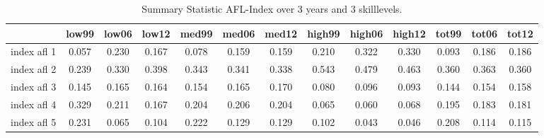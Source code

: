 \begin{table}[htbp]
\caption{\label{Tab:afldesc} Summary Statistic AFL-Index over 3 years and 3 skilllevels.}\centering\medskip
\begin{tabular}{lcccccccccccc} \hline \hline
 & low99  & low06  & low12  & med99  & med06  & med12  & high99  & high06  & high12  & tot99  & tot06  & tot12  \\  \hline 
index afl 1 &   0.057 &   0.230 &   0.167 &   0.078 &   0.159 &   0.159 &   0.210 &   0.322 &   0.330 &   0.093 &   0.186 &   0.186 \\  
index afl 2 &   0.239 &   0.330 &   0.398 &   0.343 &   0.341 &   0.338 &   0.543 &   0.479 &   0.463 &   0.360 &   0.363 &   0.360 \\  
index afl 3 &   0.145 &   0.165 &   0.164 &   0.154 &   0.165 &   0.170 &   0.080 &   0.096 &   0.093 &   0.144 &   0.154 &   0.158 \\  
index afl 4 &   0.329 &   0.211 &   0.167 &   0.204 &   0.206 &   0.204 &   0.065 &   0.060 &   0.068 &   0.195 &   0.183 &   0.181 \\  
index afl 5 &   0.231 &   0.065 &   0.104 &   0.222 &   0.129 &   0.129 &   0.102 &   0.043 &   0.046 &   0.208 &   0.114 &   0.115 \\  
\hline \hline \end{tabular}
\end{table}
